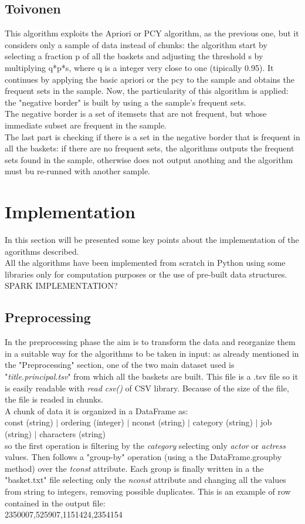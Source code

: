 \documentclass[14pt]{extarticle}
\begin{document}
\subsection{Toivonen}
This algorithm exploits the Apriori or PCY algorithm, as the previous one, but it considers only a sample of data instead of chunks: 
the algorithm start by selecting a fraction p of all the baskets and adjusting the threshold s by multiplying q*p*s, where q is a integer very close to one (tipically 0.95). It continues by applying the basic apriori or the pcy to the sample and obtains the frequent sets in the sample. Now, the particularity of this algorithm is applied: the "negative border" is built by using a the sample's frequent sets.\\
The negative border is a set of itemsets that are not frequent, but whose immediate subset are frequent in the sample.\\
The last part is checking if there is a set in the negative border that is frequent in all the baskets: if there are no frequent sets, the algorithms outputs the frequent sets found in the sample, otherwise does not output anothing and the algorithm must bu re-runned with another sample.\\

\section{Implementation}
In this section will be presented some key points about the implementation of the agorithms described.\\
All the algorithms have been implemented from scratch in Python using some libraries only for computation purposes or the use of pre-built data structures.\\
SPARK IMPLEMENTATION?
\subsection{Preprocessing}
In the preprocessing phase the aim is to transform the data and reorganize them in a suitable way for the algorithms to be taken in input: as already mentioned in the "Preprocessing" section, one of the two main dataset used is "{\it title.principal.tsv}" from which all the baskets are built. This file is a .tsv file so it is easily readable with {\it read csv()} of CSV library. Because of the size of the file, the file is readed in chunks.\\
A chunk of data it is organized in a DataFrame as:\\
const (string) $|$ ordering (integer) $|$ nconst (string) $|$ category (string) $|$ job (string) $|$ characters (string)\\
so the first operation is filtering by the {\it category} selecting only {\it actor} or {\it actress} values. Then follows a "group-by" operation (using a the DataFrame.groupby method) over the {\it tconst} attribute. Each group is finally written in a the "basket.txt" file selecting only the {\it nconst} attribute and changing all the values from string to integers, removing possible duplicates.
This is an example of row contained in the output file:\\
2350007,525907,1151424,2354154\\
\end{document}
